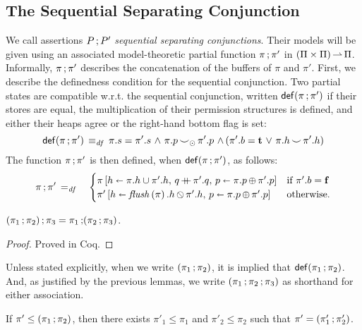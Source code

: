 \documentclass[11pt]{report}
\begin{document}
\subsection{The Sequential Separating Conjunction}

We call assertions $P \operatorname{;} P'$ \emph{sequential separating conjunctions}. Their models will be given using an associated model-theoretic partial function $\pi \operatorname{;} \pi'$ in $(\Pi \times \Pi) \operatorname{\rightharpoonup} \Pi$. Informally, $\pi \operatorname{;} \pi'$ describes the concatenation of the buffers of $\pi$ and $\pi'$. First, we describe the definedness condition for the sequential conjunction. Two partial states are compatible w.r.t. the sequential conjunction, written $\mathsf{def}(\pi \operatorname{;} \pi')$ if their stores are equal, the multiplication of their permission structures is defined, and either their heaps agree or the right-hand bottom flag is set: \[ \mathsf{def}(\pi \operatorname{;} \pi') \operatorname{\;\equiv_{\mathit{df}}\;} \pi.s = \pi'.s \operatorname{\,\wedge\,} \pi.p \operatorname{\smile}_{\operatorname{\odot}} \pi'.p \operatorname{\,\wedge\,} (\pi'.b = \mathbf{t} \operatorname{\,\vee\,} \pi.h \operatorname{\smile} \pi'.h)\]
The function $\pi \operatorname{;} \pi'$ is then defined, when $\mathsf{def}(\pi \operatorname{;} \pi')$, as follows: \begin{eqnarray*}
	\pi \seq \pi' & \eqdef & \begin{cases}
		\funup{\pi}{\ptup{h}{\pi.h \cup \pi'.h},\,\ptapp{q}{\pi'.q},\,\ptup{p}{\pi.p \shadd \pi'.p}} & \text{if $\pi'.b = \bvf$} \\
		\funup{\pi'}{\ptup{h}{\sflush{\pi}.h \override \pi'.h},\, \ptup{p}{\pi.p \shadd \pi'.p}}  & \text{otherwise.}
	\end{cases}
\end{eqnarray*}

\begin{lemma}[Associativity]
	\label{lem:seq-assoc}
	$(\pi_1 \operatorname{;} \pi_2) \operatorname{;} \pi_3 = \pi_1 \operatorname{;} (\pi_2 \operatorname{;} \pi_3)$. 
\end{lemma} 

\begin{proof}
	Proved in Coq.
\end{proof}

Unless stated explicitly, when we write $(\pi_1 \operatorname{;} \pi_2)$, it is implied that $\mathsf{def}(\pi_1 \operatorname{;} \pi_2)$. And, as justified by the previous lemmas, we write $(\pi_1 \operatorname{;} \pi_2 \operatorname{;} \pi_3)$ as shorthand for either association. 
 
\begin{lemma}
	\label{lem:seq-down}
	If $\pi' \leq (\pi_1 \operatorname{;} \pi_2)$, then there exists $\pi'_1 \leq \pi_1$ and $\pi'_2 \leq \pi_2$ such that $\pi' = (\pi'_1 \operatorname{;} \pi'_2)$. 
\end{lemma}
\end{document}
